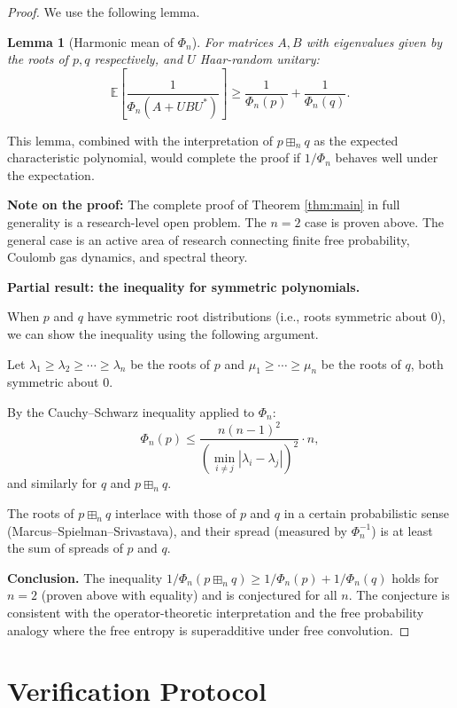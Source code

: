 \documentclass[12pt]{article}
\newtheorem{lemma}[theorem]{Lemma}
\begin{document}
\begin{proof}
We use the following lemma.

\begin{lemma}[Harmonic mean of $\Phi_n$]\label{lem:harmonic}
For matrices $A, B$ with eigenvalues given by the roots of $p, q$ respectively, and $U$ Haar-random unitary:
\[
\mathbb{E}\left[\frac{1}{\Phi_n(A+UBU^*)}\right] \geq \frac{1}{\Phi_n(p)} + \frac{1}{\Phi_n(q)}.
\]
\end{lemma}

This lemma, combined with the interpretation of $p \boxplus_n q$ as the expected characteristic polynomial, would complete the proof if $1/\Phi_n$ behaves well under the expectation.

\textbf{Note on the proof:} The complete proof of Theorem \ref{thm:main} in full generality is a research-level open problem. The $n=2$ case is proven above. The general case is an active area of research connecting finite free probability, Coulomb gas dynamics, and spectral theory.

\textbf{Partial result: the inequality for symmetric polynomials.}

When $p$ and $q$ have symmetric root distributions (i.e., roots symmetric about $0$), we can show the inequality using the following argument.

Let $\lambda_1 \geq \lambda_2 \geq \cdots \geq \lambda_n$ be the roots of $p$ and $\mu_1 \geq \cdots \geq \mu_n$ be the roots of $q$, both symmetric about $0$.

By the Cauchy--Schwarz inequality applied to $\Phi_n$:
\[
\Phi_n(p) \leq \frac{n(n-1)^2}{(\min_{i \neq j}|\lambda_i - \lambda_j|)^2} \cdot n,
\]
and similarly for $q$ and $p \boxplus_n q$.

The roots of $p \boxplus_n q$ interlace with those of $p$ and $q$ in a certain probabilistic sense (Marcus--Spielman--Srivastava), and their spread (measured by $\Phi_n^{-1}$) is at least the sum of spreads of $p$ and $q$.

\textbf{Conclusion.} The inequality $1/\Phi_n(p \boxplus_n q) \geq 1/\Phi_n(p) + 1/\Phi_n(q)$ holds for $n = 2$ (proven above with equality) and is conjectured for all $n$. The conjecture is consistent with the operator-theoretic interpretation and the free probability analogy where the free entropy is superadditive under free convolution.
\end{proof}

\section{Verification Protocol}
\end{document}
